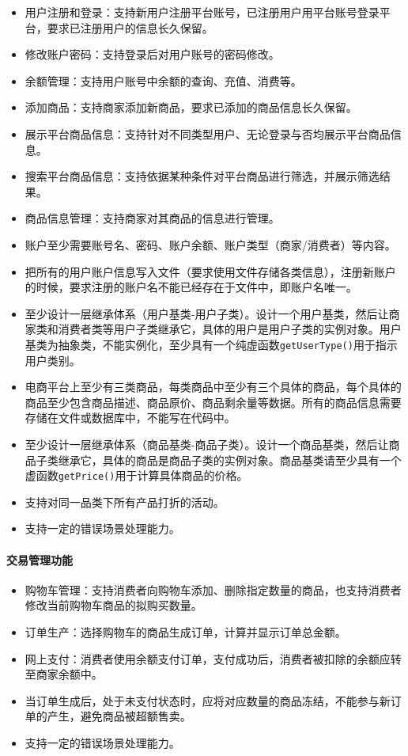 \documentclass[lang=cn,11pt,a4paper,cite=authornum]{paper}
\begin{document}
\begin{itemize}
    \item 用户注册和登录：支持新用户注册平台账号，已注册用户用平台账号登录平台，要求已注册用户的信息长久保留。
    \item 修改账户密码：支持登录后对用户账号的密码修改。
    \item 余额管理：支持用户账号中余额的查询、充值、消费等。
    \item 添加商品：支持商家添加新商品，要求已添加的商品信息长久保留。
    \item 展示平台商品信息：支持针对不同类型用户、无论登录与否均展示平台商品信息。
    \item 搜索平台商品信息：支持依据某种条件对平台商品进行筛选，并展示筛选结果。
    \item 商品信息管理：支持商家对其商品的信息进行管理。
    \item 账户至少需要账号名、密码、账户余额、账户类型（商家/消费者）等内容。
    \item 把所有的用户账户信息写入文件（要求使用文件存储各类信息），注册新账户的时候，要求注册的账户名不能已经存在于文件中，即账户名唯一。
    \item 至少设计一层继承体系（用户基类-用户子类）。设计一个用户基类，然后让商家类和消费者类等用户子类继承它，具体的用户是用户子类的实例对象。用户基类为抽象类，不能实例化，至少具有一个纯虚函数\texttt{getUserType()}用于指示用户类别。
    \item 电商平台上至少有三类商品，每类商品中至少有三个具体的商品，每个具体的商品至少包含商品描述、商品原价、商品剩余量等数据。所有的商品信息需要存储在文件或数据库中，不能写在代码中。
    \item 至少设计一层继承体系（商品基类-商品子类）。设计一个商品基类，然后让商品子类继承它，具体的商品是商品子类的实例对象。商品基类请至少具有一个虚函数\texttt{getPrice()}用于计算具体商品的价格。
    \item 支持对同一品类下所有产品打折的活动。
    \item 支持一定的错误场景处理能力。
\end{itemize}

\paragraph{交易管理功能}

\begin{itemize}
    \item 购物车管理：支持消费者向购物车添加、删除指定数量的商品，也支持消费者修改当前购物车商品的拟购买数量。
    \item 订单生产：选择购物车的商品生成订单，计算并显示订单总金额。
    \item 网上支付：消费者使用余额支付订单，支付成功后，消费者被扣除的余额应转至商家余额中。
    \item 当订单生成后，处于未支付状态时，应将对应数量的商品冻结，不能参与新订单的产生，避免商品被超额售卖。
    \item 支持一定的错误场景处理能力。
\end{itemize}
\end{document}
